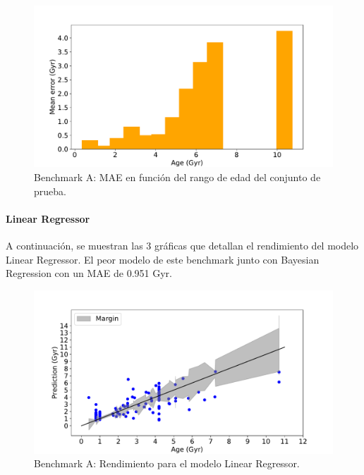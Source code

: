 \begin{figure}[H]
\begin{center}
 \includegraphics[width=0.8\linewidth]{Figuras/Experimentos/B_A_dtr_3.pdf}
\end{center}
\caption{Benchmark A: MAE en función del rango de edad del conjunto de prueba.}
 \label{fig:benchA_details_dtr_3}
\end{figure}

\paragraph{Linear Regressor} 
A continuación, se muestran las 3 gráficas que detallan el rendimiento del modelo Linear Regressor. El peor modelo de este benchmark junto con Bayesian Regression con un MAE de 0.951 Gyr.

\begin{figure}[H]
\begin{center}
 \includegraphics[width=0.8\linewidth]{Figuras/Experimentos/B_A_lr_1.pdf}
\end{center}
\caption{Benchmark A: Rendimiento para el modelo Linear Regressor.}
 \label{fig:benchA_details_lr_1}
\end{figure}


